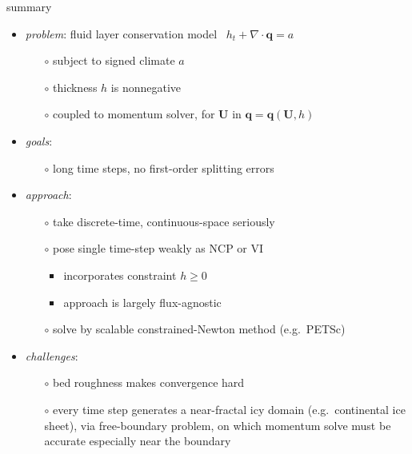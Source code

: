 \documentclass[xcolor={dvipsnames}]{beamer}
\newcommand\bq{\mathbf{q}}
\newcommand\bU{\mathbf{U}}
\newcommand\Div{\nabla\cdot}
\begin{document}
\begin{frame}{summary}

  \begin{itemize}
  \item \emph{problem}: fluid layer conservation model \, $h_t + \Div\bq = a$
    \begin{itemize}
    \item[$\circ$]  subject to signed climate $a$
    \item[$\circ$]  thickness $h$ is nonnegative
    \item[$\circ$]  coupled to momentum solver, for $\bU$ in $\bq=\bq(\bU,h)$
    \end{itemize}
  \item \emph{goals}:
    \begin{itemize}
    \item[$\circ$]  long time steps, no first-order splitting errors
    \end{itemize}
  \item \emph{approach}:
    \begin{itemize}
    \item[$\circ$]  take discrete-time, continuous-space seriously
    \item[$\circ$]  pose single time-step weakly as NCP or VI
      \begin{itemize}
      \item  incorporates constraint $h\ge 0$
      \item  approach is largely flux-agnostic
      \end{itemize}
    \item[$\circ$]  solve by scalable constrained-Newton method (e.g.~PETSc)
    \end{itemize}
  \item \emph{challenges}:
    \begin{itemize}
    \item[$\circ$]  bed roughness makes convergence hard
    \item[$\circ$]  \alert{every time step generates a near-fractal icy domain (e.g.~continental ice sheet), via free-boundary problem, on which momentum solve must be accurate especially near the boundary}
    \end{itemize}
  \end{itemize}
\end{frame}
\end{document}
